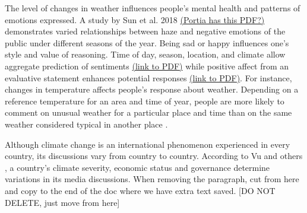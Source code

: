 \documentclass{article}
\begin{document}
The level of changes in weather influences people’s mental health and patterns of emotions expressed. A study by Sun et al. 2018 \href{file:///Users/portia/Downloads/ijerph-16-00086-v2 20(1).pdf.}{(Portia has this PDF?)} demonstrates varied relationships between haze and negative emotions of the public under different seasons of the year. Being sad or happy influences one's style and value of reasoning. Time of day, season, location, and climate allow aggregate prediction of sentiments \cite{hannak_tweetin_2012} \href{https://www.ccs.neu.edu/~amislove/publications/Weather-ICWSM.pdf}{(link to PDF)} while positive affect from an evaluative statement enhances potential responses \cite{clore_how_2007} \href{https://www.ncbi.nlm.nih.gov/pmc/articles/PMC2483304/pdf/nihms40349.pdf}{(link to PDF)}. For instance, changes in temperature affects people’s response about weather. Depending on a reference temperature for an  area and time of year, people are more likely to comment on unusual weather for a particular place and time than on the same weather considered typical in another place \cite{moore_rapidly_2019}.

Although climate change is an international phenomenon experienced in every country, its discussions vary from country to country. According to Vu and others \cite{vu_nationalizing_2019}, a country’s climate severity, economic status and governance determine variations in its media discussions. 
When removing the paragraph, cut from here and copy to the end of the doc where we have extra text saved. [DO NOT DELETE, just move from here]
\end{document}
